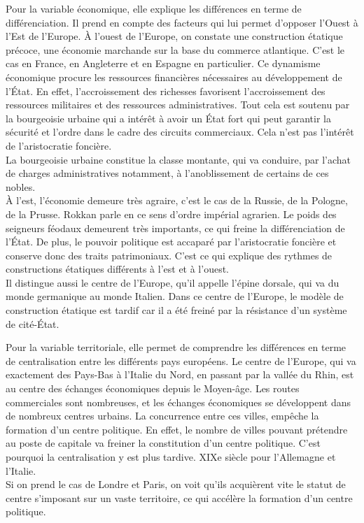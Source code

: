 \documentclass[10pt, a4paper, openany]{book}
\begin{document}
Pour la variable économique, elle explique les différences en terme de différenciation. Il prend en compte des facteurs qui lui permet d'opposer l'Ouest à l'Est de l'Europe. À l'ouest de l'Europe, on constate une construction étatique précoce, une économie marchande sur la base du commerce atlantique. C'est le cas en France, en Angleterre et en Espagne en particulier. Ce dynamisme économique procure les ressources financières nécessaires au développement de l'État. En effet, l'accroissement des richesses favorisent l'accroissement des ressources militaires et des ressources administratives. Tout cela est soutenu par la bourgeoisie urbaine qui a intérêt à avoir un État fort qui peut garantir la sécurité et l'ordre dans le cadre des circuits commerciaux. Cela n'est pas l'intérêt de l'aristocratie foncière. \\
La bourgeoisie urbaine constitue la classe montante, qui va conduire, par l'achat de charges administratives notamment, à l'anoblissement de certains de ces nobles. \\
À l'est, l'économie demeure très agraire, c'est le cas de la Russie, de la Pologne, de la Prusse. Rokkan parle en ce sens d'ordre impérial agrarien. Le poids des seigneurs féodaux demeurent très importants, ce qui freine la différenciation de l'État. De plus, le pouvoir politique est accaparé par l'aristocratie foncière et conserve donc des traits patrimoniaux. C'est ce qui explique des rythmes de constructions étatiques différents à l'est et à l'ouest. \\
Il distingue aussi le centre de l'Europe, qu'il appelle l'épine dorsale, qui va du monde germanique au monde Italien. Dans ce centre de l'Europe, le modèle de construction étatique est tardif car il a été freiné par la résistance d'un système de cité-État. 


Pour la variable territoriale, elle permet de comprendre les différences en terme de centralisation entre les différents pays européens. Le centre de l'Europe, qui va exactement des Pays-Bas à l'Italie du Nord, en passant par la vallée du Rhin, est au centre des échanges économiques depuis le Moyen-âge. Les routes commerciales sont nombreuses, et les échanges économiques se développent dans de nombreux centres urbains. La concurrence entre ces villes, empêche la formation d'un centre politique. En effet, le nombre de villes pouvant prétendre au poste de capitale va freiner la constitution d'un centre politique. C'est pourquoi la centralisation y est plus tardive. XIXe siècle pour l'Allemagne et l'Italie. \\
Si on prend le cas de Londre et Paris, on voit qu'ils acquièrent vite le statut de centre s'imposant sur un vaste territoire, ce qui accélère la formation d'un centre politique. 
\end{document}
